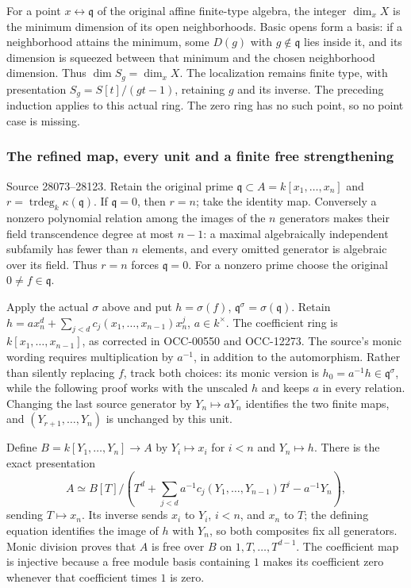 For a point \(x\leftrightarrow\mathfrak q\) of the original affine finite-type algebra, the integer \(\dim_xX\) is the minimum dimension of its open neighborhoods. Basic opens form a basis: if a neighborhood attains the minimum, some \(D(g)\) with \(g\notin\mathfrak q\) lies inside it, and its dimension is squeezed between that minimum and the chosen neighborhood dimension. Thus \(\dim S_g=\dim_xX\). The localization remains finite type, with presentation \(S_g=S[t]/(gt-1)\), retaining \(g\) and its inverse. The preceding induction applies to this actual ring. The zero ring has no such point, so no point case is missing.

\subsubsection{The refined map, every unit and a finite free strengthening}\label{the-refined-map-every-unit-and-a-finite-free-strengthening}

Source 28073--28123. Retain the original prime \(\mathfrak q\subset A=k[x_1,\ldots,x_n]\) and \(r=\operatorname{trdeg}_k\kappa(\mathfrak q)\). If \(\mathfrak q=0\), then \(r=n\); take the identity map. Conversely a nonzero polynomial relation among the images of the \(n\) generators makes their field transcendence degree at most \(n-1\): a maximal algebraically independent subfamily has fewer than \(n\) elements, and every omitted generator is algebraic over its field. Thus \(r=n\) forces \(\mathfrak q=0\). For a nonzero prime choose the original \(0\ne f\in\mathfrak q\).

Apply the actual \(\sigma\) above and put \(h=\sigma(f)\), \(\mathfrak q^\sigma=\sigma(\mathfrak q)\). Retain \(h=a x_n^d+\sum_{j<d}c_j(x_1,\ldots,x_{n-1})x_n^j\), \(a\in k^\times\). The coefficient ring is \(k[x_1,\ldots,x_{n-1}]\), as corrected in OCC-00550 and OCC-12273. The source's monic wording requires multiplication by \(a^{-1}\), in addition to the automorphism. Rather than silently replacing \(f\), track both choices: its monic version is \(h_0=a^{-1}h\in\mathfrak q^\sigma\), while the following proof works with the unscaled \(h\) and keeps \(a\) in every relation. Changing the last source generator by \(Y_n\mapsto aY_n\) identifies the two finite maps, and \((Y_{r+1},\ldots,Y_n)\) is unchanged by this unit.

Define \(B=k[Y_1,\ldots,Y_n]\to A\) by \(Y_i\mapsto x_i\) for \(i<n\) and \(Y_n\mapsto h\). There is the exact presentation \[
 A\simeq B[T]\big/
 \left(T^d+\sum_{j<d}a^{-1}c_j(Y_1,\ldots,Y_{n-1})T^j-a^{-1}Y_n\right),
\] sending \(T\mapsto x_n\). Its inverse sends \(x_i\) to \(Y_i\), \(i<n\), and \(x_n\) to \(T\); the defining equation identifies the image of \(h\) with \(Y_n\), so both composites fix all generators. Monic division proves that \(A\) is free over \(B\) on \(1,T,\ldots,T^{d-1}\). The coefficient map is injective because a free module basis containing \(1\) makes its coefficient zero whenever that coefficient times \(1\) is zero.

